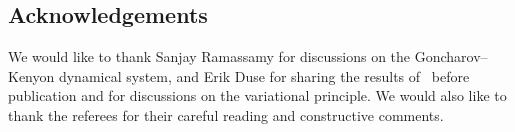 \documentclass[AHL,Unicode,longabstracts,published]{cedram}
\begin{document}
\subsection*{Acknowledgements}
We would like to thank Sanjay Ramassamy for discussions on the Goncharov--Kenyon dynamical system, and Erik Duse for sharing the results of~\cite{Duse} before publication and for discussions on the variational principle. We would also like to thank the referees for their careful reading and constructive comments.




\end{document}
